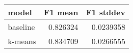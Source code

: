 \begin{tabular}{lrr}
\toprule
 model    &   F1 mean &   F1 stddev \\
\midrule
 baseline &  0.826324 &   0.0239358 \\
 k-means  &  0.834709 &   0.0266555 \\
\bottomrule
\end{tabular}